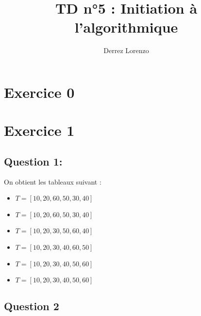 \documentclass{article}
\title{\textbf{TD n°5 : Initiation à l'algorithmique}}
\author{Derrez Lorenzo}
\begin{document}
\maketitle

\section*{\textbf{Exercice 0}}


\section*{\textbf{Exercice 1}}

\subsection*{Question 1:}
On obtient les tableaux suivant : 
\begin{itemize}
    \item $ T = [10, 20, 60, 50, 30, 40] $
    \item $ T = [10, 20, 60, 50, 30, 40] $
    \item $ T = [10, 20, 30, 50, 60, 40] $
    \item $ T = [10, 20, 30, 40, 60, 50] $
    \item $ T = [10, 20, 30, 40, 50, 60] $
    \item $ T = [10, 20, 30, 40, 50, 60] $
\end{itemize}

\subsection*{Question 2}
\end{document}
